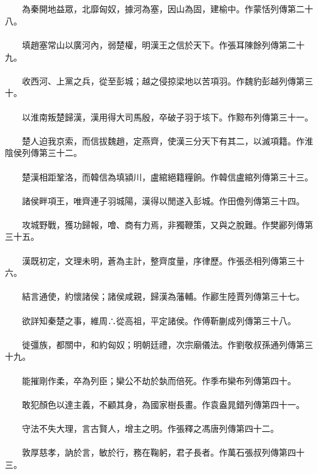 \\\\
　　為秦開地益眾，北靡匈奴，據河為塞，因山為固，建榆中。作蒙恬列傳第二十八。
\\\\
　　填趙塞常山以廣河內，弱楚權，明漢王之信於天下。作張耳陳餘列傳第二十九。
\\\\
　　收西河、上黨之兵，從至彭城；越之侵掠梁地以苦項羽。作魏豹彭越列傳第三十。
\\\\
　　以淮南叛楚歸漢，漢用得大司馬殷，卒破子羽于垓下。作黥布列傳第三十一。
\\\\
　　楚人迫我京索，而信拔魏趙，定燕齊，使漢三分天下有其二，以滅項籍。作淮陰侯列傳第三十二。
\\\\
　　楚漢相距鞏洛，而韓信為填潁川，盧綰絕籍糧餉。作韓信盧綰列傳第三十三。
\\\\
　　諸侯畔項王，唯齊連子羽城陽，漢得以閒遂入彭城。作田儋列傳第三十四。
\\\\
　　攻城野戰，獲功歸報，噲、商有力焉，非獨鞭策，又與之脫難。作樊酈列傳第三十五。
\\\\
　　漢既初定，文理未明，蒼為主計，整齊度量，序律歷。作張丞相列傳第三十六。
\\\\
　　結言通使，約懷諸侯；諸侯咸親，歸漢為藩輔。作酈生陸賈列傳第三十七。
\\\\
　　欲詳知秦楚之事，維周∴從高祖，平定諸侯。作傅靳蒯成列傳第三十八。
\\\\
　　徙彊族，都關中，和約匈奴；明朝廷禮，次宗廟儀法。作劉敬叔孫通列傳第三十九。
\\\\
　　能摧剛作柔，卒為列臣；欒公不劫於埶而倍死。作季布欒布列傳第四十。
\\\\
　　敢犯顏色以達主義，不顧其身，為國家樹長畫。作袁盎晁錯列傳第四十一。
\\\\
　　守法不失大理，言古賢人，增主之明。作張釋之馮唐列傳第四十二。
\\\\
　　敦厚慈孝，訥於言，敏於行，務在鞠躬，君子長者。作萬石張叔列傳第四十三。
\\\\
